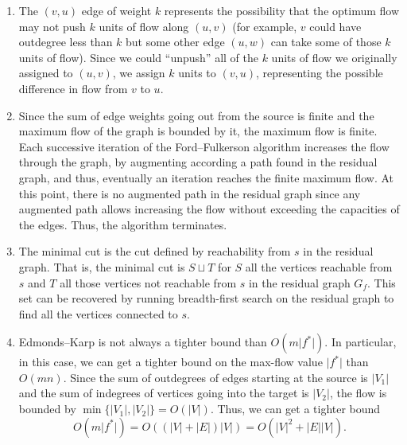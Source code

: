 \documentclass[12 pt, letterpaper]{hmcpset}
\begin{document}
\begin{solution}
	\begin{enumerate}
		\item The $(v, u)$ edge of weight $k$ represents the possibility that the optimum flow may not push $k$ units of flow along $(u, v)$ (for example, $v$ could have outdegree less than $k$ but some other edge $(u, w)$ can take some of those $k$ units of flow). Since we could ``unpush'' all of the $k$ units of flow we originally assigned to $(u, v)$, we assign $k$ units to $(v, u)$, representing the possible difference in flow from $v$ to $u$.

		\item Since the sum of edge weights going out from the source is finite and the maximum flow of the graph is bounded by it, the maximum flow is finite. Each successive iteration of the Ford--Fulkerson algorithm increases the flow through the graph, by augmenting according a path found in the residual graph, and thus, eventually an iteration reaches the finite maximum flow. At this point, there is no augmented path in the residual graph since any augmented path allows increasing the flow without exceeding the capacities of the edges. Thus, the algorithm terminates.

		\item The minimal cut is the cut defined by reachability from $s$ in the residual graph. That is, the minimal cut is $S \sqcup T$ for $S$ all the vertices reachable from $s$ and $T$ all those vertices not reachable from $s$ in the residual graph $G_{f}$. This set can be recovered by running breadth-first search on the residual graph to find all the vertices connected to $s$.

		\item Edmonds--Karp is not always a tighter bound than $O(m \lvert f^{*} \rvert)$. In particular, in this case, we can get a tighter bound on the max-flow value $\lvert f^{*} \rvert$ than $O(m n)$. Since the sum of outdegrees of edges starting at the source is $\lvert V_{1} \rvert$ and the sum of indegrees of vertices going into the target is $\lvert V_{2} \rvert$, the flow is bounded by $\min \{ \lvert V_{1} \rvert, \lvert V_{2} \rvert \} = O(\lvert V \rvert)$. Thus, we can get a tighter bound
			\[
				O(m \lvert f^{*} \rvert) = O((\lvert V \rvert + \lvert E \rvert) \lvert V \rvert) = O(\lvert V \rvert^{2} + \lvert E \rvert \lvert V \rvert).
			\]
	\end{enumerate}
\end{solution}
\end{document}
